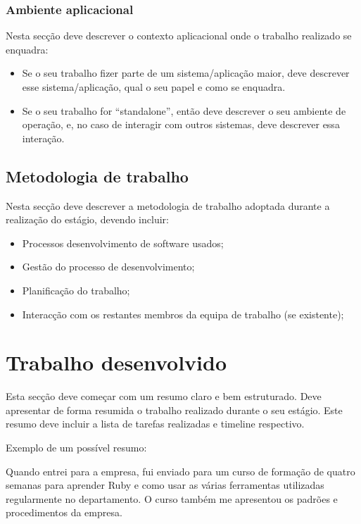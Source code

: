 \documentclass{article}
\begin{document}
\subsubsection{Ambiente aplicacional}
Nesta secção deve descrever o contexto aplicacional onde o trabalho realizado se enquadra:

\begin{itemize}
\item Se o seu trabalho fizer parte de um sistema/aplicação maior, deve descrever esse sistema/aplicação, qual o seu papel e como se enquadra. 
\item Se o seu trabalho for “standalone”, então deve descrever o seu ambiente de operação, e, no caso de interagir com outros sistemas, deve descrever essa interação.
\end{itemize}


\subsection{Metodologia de trabalho}
Nesta secção deve descrever a metodologia de trabalho adoptada durante a realização do estágio, devendo incluir:

\begin{itemize}
    
\item Processos desenvolvimento de software usados;
\item Gestão do processo de desenvolvimento;
\item Planificação do trabalho;
\item Interacção com os restantes membros da equipa de trabalho (se existente);

\end{itemize}

\cleardoublepage
\section{Trabalho desenvolvido}
\label{sec:trab-dev}
Esta secção deve começar com um resumo claro e bem estruturado. Deve apresentar de forma resumida o trabalho realizado durante o seu estágio. Este resumo deve incluir a lista de tarefas realizadas e timeline respectivo.

Exemplo de um possível resumo:

Quando entrei para a empresa, fui enviado para um curso de formação de quatro semanas para aprender Ruby e como usar as várias ferramentas utilizadas regularmente no departamento. O curso também me apresentou os padrões e procedimentos da empresa.
\end{document}

